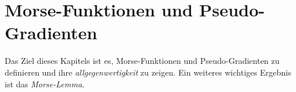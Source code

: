 \chapter{Morse-Funktionen und Pseudo-Gradienten}

Das Ziel dieses Kapitels ist es, Morse-Funktionen und Pseudo-Gradienten zu
definieren und ihre 
\textit{allgegenwertigkeit} zu zeigen. Ein weiteres wichtiges Ergebnis ist
das \textit{Morse-Lemma}.

